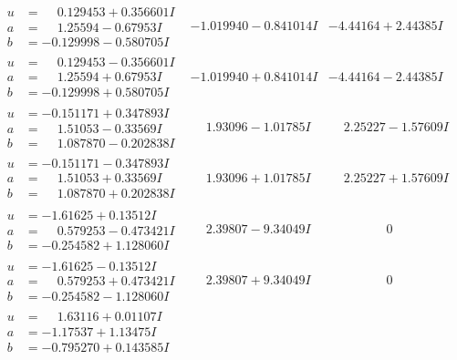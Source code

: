\documentclass[1p]{elsarticle_modified}
\theoremstyle{definition}
\begin{document}
$$\begin{array}{c|c|c}
\begin{aligned}
u &= \phantom{-}0.129453 + 0.356601 I \\
a &= \phantom{-}1.25594 - 0.67953 I \\
b &= -0.129998 - 0.580705 I\end{aligned}
 & -1.019940 - 0.841014 I & -4.44164 + 2.44385 I \\ \hline\begin{aligned}
u &= \phantom{-}0.129453 - 0.356601 I \\
a &= \phantom{-}1.25594 + 0.67953 I \\
b &= -0.129998 + 0.580705 I\end{aligned}
 & -1.019940 + 0.841014 I & -4.44164 - 2.44385 I \\ \hline\begin{aligned}
u &= -0.151171 + 0.347893 I \\
a &= \phantom{-}1.51053 - 0.33569 I \\
b &= \phantom{-}1.087870 - 0.202838 I\end{aligned}
 & \phantom{-}1.93096 - 1.01785 I & \phantom{-}2.25227 - 1.57609 I \\ \hline\begin{aligned}
u &= -0.151171 - 0.347893 I \\
a &= \phantom{-}1.51053 + 0.33569 I \\
b &= \phantom{-}1.087870 + 0.202838 I\end{aligned}
 & \phantom{-}1.93096 + 1.01785 I & \phantom{-}2.25227 + 1.57609 I \\ \hline\begin{aligned}
u &= -1.61625 + 0.13512 I \\
a &= \phantom{-}0.579253 - 0.473421 I \\
b &= -0.254582 + 1.128060 I\end{aligned}
 & \phantom{-}2.39807 - 9.34049 I & \phantom{-0.000000 } 0 \\ \hline\begin{aligned}
u &= -1.61625 - 0.13512 I \\
a &= \phantom{-}0.579253 + 0.473421 I \\
b &= -0.254582 - 1.128060 I\end{aligned}
 & \phantom{-}2.39807 + 9.34049 I & \phantom{-0.000000 } 0 \\ \hline\begin{aligned}
u &= \phantom{-}1.63116 + 0.01107 I \\
a &= -1.17537 + 1.13475 I \\
b &= -0.795270 + 0.143585 I\end{aligned}

\end{array}$$
\end{document}
